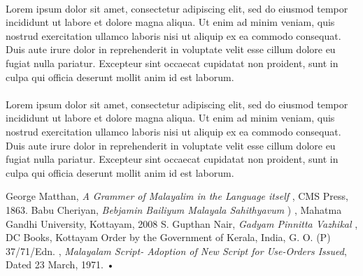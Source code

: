 \documentclass[10pt]{article}
\begin{document}
\paragraph{}
Lorem ipsum dolor sit amet, consectetur adipiscing elit, sed do eiusmod tempor incididunt ut labore et dolore magna aliqua. Ut enim ad minim veniam, quis nostrud exercitation ullamco laboris nisi ut aliquip ex ea commodo consequat. Duis aute irure dolor in reprehenderit in voluptate velit esse cillum dolore eu fugiat nulla pariatur. Excepteur sint occaecat cupidatat non proident, sunt in culpa qui officia deserunt mollit anim id est laborum.

\paragraph{}
Lorem ipsum dolor sit amet, consectetur adipiscing elit, sed do eiusmod tempor incididunt ut labore et dolore magna aliqua. Ut enim ad minim veniam, quis nostrud exercitation ullamco laboris nisi ut aliquip ex ea commodo consequat. Duis aute irure dolor in reprehenderit in voluptate velit esse cillum dolore eu fugiat nulla pariatur. Excepteur sint occaecat cupidatat non proident, sunt in culpa qui officia deserunt mollit anim id est laborum.


\begin{thebibliography}{9}
 George Matthan, \textit{A Grammer of Malayalim in the Language itself }, CMS Press, 1863.
 Babu Cheriyan, \textit{Bebjamin Bailiyum Malayala Sahithyavum} {) }, Mahatma Gandhi University, Kottayam, 2008
 S. Gupthan Nair, \textit{Gadyam Pinnitta Vazhikal}{ }, DC Books, Kottayam
 Order by the Government of Kerala, India, G. O. (P) 37/71/Edn. , \textit{Malayalam Script- Adoption of New Script for Use-Orders Issued}, Dated 23 March, 1971.
•


\end{thebibliography}
\end{document}
